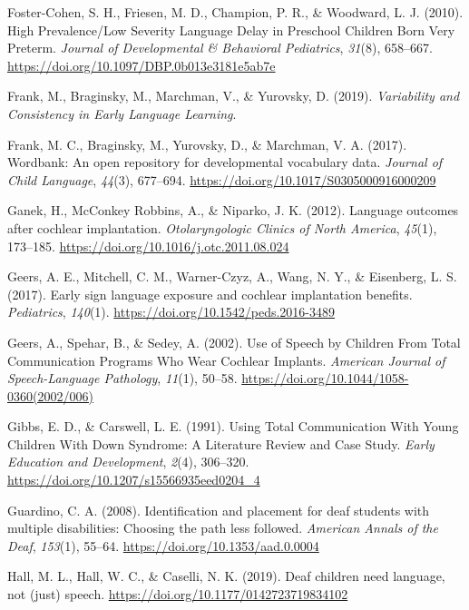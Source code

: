 \documentclass[english,man]{apa6}
\begin{document}
\leavevmode\hypertarget{ref-foster-cohen2010}{}%
Foster-Cohen, S. H., Friesen, M. D., Champion, P. R., \& Woodward, L. J. (2010). High Prevalence/Low Severity Language Delay in Preschool Children Born Very Preterm. \emph{Journal of Developmental \& Behavioral Pediatrics}, \emph{31}(8), 658--667. \url{https://doi.org/10.1097/DBP.0b013e3181e5ab7e}

\leavevmode\hypertarget{ref-frank2019}{}%
Frank, M., Braginsky, M., Marchman, V., \& Yurovsky, D. (2019). \emph{Variability and Consistency in Early Language Learning}.

\leavevmode\hypertarget{ref-frank2017}{}%
Frank, M. C., Braginsky, M., Yurovsky, D., \& Marchman, V. A. (2017). Wordbank: An open repository for developmental vocabulary data. \emph{Journal of Child Language}, \emph{44}(3), 677--694. \url{https://doi.org/10.1017/S0305000916000209}

\leavevmode\hypertarget{ref-ganek2012}{}%
Ganek, H., McConkey Robbins, A., \& Niparko, J. K. (2012). Language outcomes after cochlear implantation. \emph{Otolaryngologic Clinics of North America}, \emph{45}(1), 173--185. \url{https://doi.org/10.1016/j.otc.2011.08.024}

\leavevmode\hypertarget{ref-geers2017}{}%
Geers, A. E., Mitchell, C. M., Warner-Czyz, A., Wang, N. Y., \& Eisenberg, L. S. (2017). Early sign language exposure and cochlear implantation benefits. \emph{Pediatrics}, \emph{140}(1). \url{https://doi.org/10.1542/peds.2016-3489}

\leavevmode\hypertarget{ref-geers2002}{}%
Geers, A., Spehar, B., \& Sedey, A. (2002). Use of Speech by Children From Total Communication Programs Who Wear Cochlear Implants. \emph{American Journal of Speech-Language Pathology}, \emph{11}(1), 50--58. \url{https://doi.org/10.1044/1058-0360(2002/006)}

\leavevmode\hypertarget{ref-gibbs1991}{}%
Gibbs, E. D., \& Carswell, L. E. (1991). Using Total Communication With Young Children With Down Syndrome: A Literature Review and Case Study. \emph{Early Education and Development}, \emph{2}(4), 306--320. \url{https://doi.org/10.1207/s15566935eed0204_4}

\leavevmode\hypertarget{ref-guardino2008}{}%
Guardino, C. A. (2008). Identification and placement for deaf students with multiple disabilities: Choosing the path less followed. \emph{American Annals of the Deaf}, \emph{153}(1), 55--64. \url{https://doi.org/10.1353/aad.0.0004}

\leavevmode\hypertarget{ref-hall2019}{}%
Hall, M. L., Hall, W. C., \& Caselli, N. K. (2019). Deaf children need language, not (just) speech. \url{https://doi.org/10.1177/0142723719834102}
\end{document}
